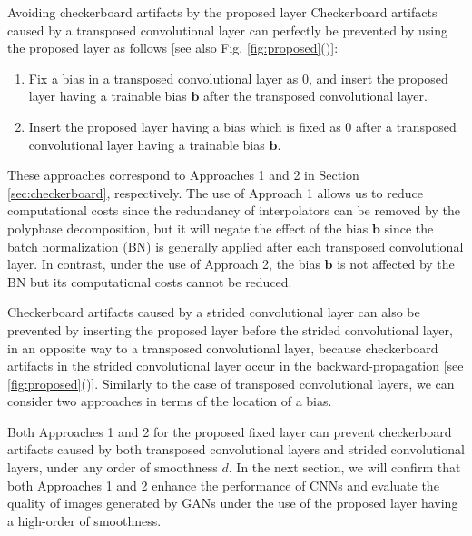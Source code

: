 \documentclass{article}
\makeatletter
\renewcommand\subsection{\@startsection{subsection}{2}{\z@}
                      {0.5ex \@plus 0ex \@minus -2ex}
                      {0.5ex \@plus 0ex}
                      {\normalfont\large\bfseries}}
\newcommand{\myvector}[1]{\boldsymbol{#1}}
\newcounter{num}
\makeatother
\begin{document}
\subsection{Avoiding checkerboard artifacts by the proposed layer}
  Checkerboard artifacts caused by a transposed convolutional layer
  can perfectly be prevented by using the proposed layer as follows
  [see also Fig. \ref{fig:proposed}()]:
  \begin{enumerate}[nosep, label=\textbf{Approach \arabic*}, leftmargin=*]
    \item Fix a bias in a transposed convolutional layer as $0$,
      and insert the proposed layer having a trainable bias $\myvector{b}$ after
      the transposed convolutional layer.
    \item Insert the proposed layer having a bias which is fixed as 0
      after a transposed convolutional layer having a trainable bias $\myvector{b}$.
  \end{enumerate}
  These approaches correspond to Approaches 1 and 2 in Section \ref{sec:checkerboard},
  respectively.
  The use of Approach 1 allows us to reduce computational costs
  since the redundancy of interpolators can be removed by the polyphase decomposition,
  but it will negate the effect of the bias $\myvector{b}$
  since the batch normalization (BN) is generally applied
  after each transposed convolutional layer.
  In contrast,
  under the use of Approach 2,
  the bias $\myvector{b}$ is not affected by the BN
  but its computational costs cannot be reduced.

  Checkerboard artifacts caused by a strided convolutional layer can also be prevented
  by inserting the proposed layer before the strided convolutional layer,
  in an opposite way to a transposed convolutional layer,
  because checkerboard artifacts in the strided convolutional layer
  occur in the backward-propagation
  [see \ref{fig:proposed}()].
  Similarly to the case of transposed convolutional layers,
  we can consider two approaches in terms of the location of a bias.

  Both Approaches 1 and 2 for the proposed fixed layer
  can prevent checkerboard artifacts caused
  by both transposed convolutional layers and strided convolutional layers,
  under any order of smoothness $d$.
  In the next section,
  we will confirm that both Approaches 1 and 2 enhance the performance of CNNs
  and evaluate the quality of images generated by GANs
  under the use of the proposed layer having a high-order of smoothness.
\end{document}
